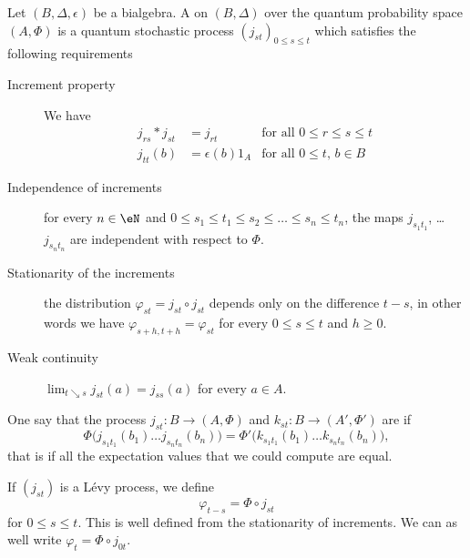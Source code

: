 \begin{definition}
    Let $(B,\Delta,\epsilon)$ be a bialgebra. A  on $(B,\Delta)$ over the quantum probability space $(A,\Phi)$ is a quantum stochastic process $(j_{st})_{0\leq s\leq t}$ which satisfies the following requirements
    \begin{description}
        \item[Increment property] We have
            \begin{subequations}
                \begin{align}
                    j_{rs}*j_{st}&=j_{rt}       &\text{for all $0\leq r\leq s\leq t$}\\
                    j_{tt}(b)&=\epsilon(b)1_A   &\text{for all $0\leq t$, $b\in B$}
                \end{align}
            \end{subequations}
            
        \item[Independence of increments]
            for every $n\in\eN$ and $0\leq s_1\leq t_1\leq s_2\leq\ldots\leq s_n\leq t_n$, the maps $j_{s_1t_1}$, \ldots $j_{s_nt_n}$ are independent with respect to $\Phi$.
        \item[Stationarity of the increments]
            the distribution $\varphi_{st}=j_{st}\circ j_{st}$ depends only on the difference $t-s$, in other words we have $\varphi_{s+h,t+h}=\varphi_{st}$ for every $0\leq s\leq t$ and $h\geq 0$.
        \item[Weak continuity]
            $\lim_{t\searrow s}j_{st}(a)=j_{ss}(a)$ for every $a\in A$.
    \end{description}
\end{definition}

One say that the process $j_{st}\colon B\to (A,\Phi)$ and $k_{st}\colon B\to (A',\Phi')$ are  if
\begin{equation}
    \Phi\big( j_{s_1t_1}(b_1)\ldots j_{s_nt_n}(b_n) \big)=\Phi'\big( k_{s_1t_1}(b_1)\ldots k_{s_nt_n}(b_n) \big),
\end{equation}
that is if all the expectation values that we could compute are equal.

If $(j_{st})$ is a Lévy process, we define 
\begin{equation}
    \varphi_{t-s}=\Phi\circ j_{st}
\end{equation}
for $0\leq s\leq t$. This is well defined from the stationarity of increments. We can as well write $\varphi_t=\Phi\circ j_{0t}$.

